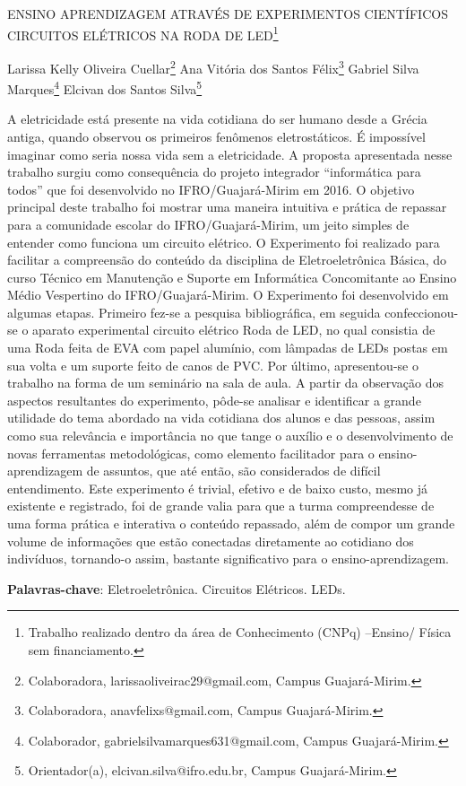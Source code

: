 \documentclass[article,12pt,onesidea,4paper,english,brazil]{abntex2}
\begin{document}
	
	
	\frenchspacing 
	
	\begin{center}
		\LARGE ENSINO APRENDIZAGEM ATRAVÉS DE EXPERIMENTOS CIENTÍFICOS
		CIRCUITOS ELÉTRICOS NA RODA DE LED\footnote{Trabalho realizado dentro da área de Conhecimento (CNPq) –Ensino/ Física sem financiamento.}
		
		\normalsize
		Larissa Kelly Oliveira Cuellar\footnote{Colaboradora, larissaoliveirac29@gmail.com, Campus Guajará-Mirim.} 
		Ana Vitória dos Santos Félix\footnote{Colaboradora, anavfelixs@gmail.com, Campus Guajará-Mirim.} 
	Gabriel Silva Marques\footnote{Colaborador, gabrielsilvamarques631@gmail.com, Campus Guajará-Mirim.} 
		Elcivan dos Santos Silva\footnote{Orientador(a), elcivan.silva@ifro.edu.br, Campus Guajará-Mirim.} 
	\end{center}
	
	\noindent A eletricidade está presente na vida cotidiana do ser humano desde a Grécia antiga,
	quando observou os primeiros fenômenos eletrostáticos. É impossível imaginar
	como seria nossa vida sem a eletricidade. A proposta apresentada nesse trabalho
	surgiu como consequência do projeto integrador “informática para todos” que foi
	desenvolvido no IFRO/Guajará-Mirim em 2016. O objetivo principal deste trabalho foi
	mostrar uma maneira intuitiva e prática de repassar para a comunidade escolar do
	IFRO/Guajará-Mirim, um jeito simples de entender como funciona um circuito
	elétrico. O Experimento foi realizado para facilitar a compreensão do conteúdo da
	disciplina de Eletroeletrônica Básica, do curso Técnico em Manutenção e Suporte
	em Informática Concomitante ao Ensino Médio Vespertino do IFRO/Guajará-Mirim.
	O Experimento foi desenvolvido em algumas etapas. Primeiro fez-se a pesquisa
	bibliográfica, em seguida confeccionou-se o aparato experimental circuito elétrico
	Roda de LED, no qual consistia de uma Roda feita de EVA com papel alumínio, com
	lâmpadas de LEDs postas em sua volta e um suporte feito de canos de PVC. Por
	último, apresentou-se o trabalho na forma de um seminário na sala de aula. A partir
	da observação dos aspectos resultantes do experimento, pôde-se analisar e
	identificar a grande utilidade do tema abordado na vida cotidiana dos alunos e das
	pessoas, assim como sua relevância e importância no que tange o auxílio e o
	desenvolvimento de novas ferramentas metodológicas, como elemento facilitador
	para o ensino-aprendizagem de assuntos, que até então, são considerados de difícil
	entendimento. Este experimento é trivial, efetivo e de baixo custo, mesmo já
	existente e registrado, foi de grande valia para que a turma compreendesse de uma
	forma prática e interativa o conteúdo repassado, além de compor um grande volume
	de informações que estão conectadas diretamente ao cotidiano dos indivíduos,
	tornando-o assim, bastante significativo para o ensino-aprendizagem.
	
	\vspace{\onelineskip}
	
	\noindent
	\textbf{Palavras-chave}: Eletroeletrônica. Circuitos Elétricos. LEDs.
	
\end{document}

